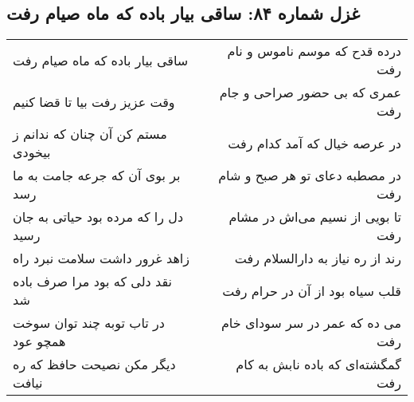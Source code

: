 \begin{center}
\section*{غزل شماره ۸۴: ساقی بیار باده که ماه صیام رفت}
\label{sec:sh084}
\begin{longtable}{l p{0.5cm} r}
ساقی بیار باده که ماه صیام رفت
&&
درده قدح که موسم ناموس و نام رفت
\\
وقت عزیز رفت بیا تا قضا کنیم
&&
عمری که بی حضور صراحی و جام رفت
\\
مستم کن آن چنان که ندانم ز بیخودی
&&
در عرصه خیال که آمد کدام رفت
\\
بر بوی آن که جرعه جامت به ما رسد
&&
در مصطبه دعای تو هر صبح و شام رفت
\\
دل را که مرده بود حیاتی به جان رسید
&&
تا بویی از نسیم می‌اش در مشام رفت
\\
زاهد غرور داشت سلامت نبرد راه
&&
رند از ره نیاز به دارالسلام رفت
\\
نقد دلی که بود مرا صرف باده شد
&&
قلب سیاه بود از آن در حرام رفت
\\
در تاب توبه چند توان سوخت همچو عود
&&
می ده که عمر در سر سودای خام رفت
\\
دیگر مکن نصیحت حافظ که ره نیافت
&&
گمگشته‌ای که باده نابش به کام رفت
\\
\end{longtable}
\end{center}
